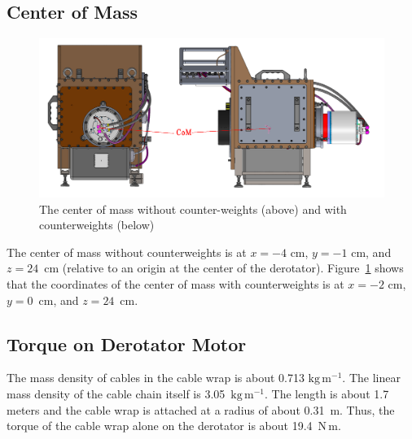 \documentclass{article}
\newcommand{\unit}[1]{\ensuremath{\mathrm{#1}}}
\begin{document}
\subsection{Center of Mass}

\begin{figure}[p]
\begin{center}
\includegraphics[width=\linewidth]{newfigures/CoMIN.png}
\end{center}
\caption[The Center of Mass.]{The center of mass without counter-weights (above) and with counterweights (below)}
\label{figure:alex-com}
\end{figure}

The center of mass without counterweights is at $x = -4$ cm, $y = -1$ cm, and $z = 24$~cm (relative to an origin at the center of the derotator). 
Figure~\ref{figure:alex-com} shows that the coordinates of the center of mass  with counterweights is at $x = -2$ cm, $y = 0$~cm, and $z = 24$~cm.


\subsection{Torque on Derotator Motor}

The mass density of cables in the cable wrap is about 0.713 \unit{kg\,m^{-1}}. The linear mass density of the cable chain itself is 3.05~\unit{kg\,m^{-1}}. The length is about 1.7 meters and the cable wrap is attached at a radius of about 0.31~m. Thus, the torque of the cable wrap alone on the derotator is about 19.4~\unit{N\,m}.
\end{document}
